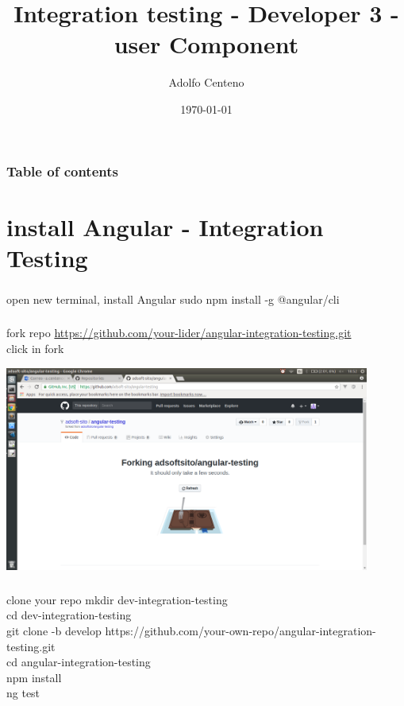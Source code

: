 \documentclass{beamer}
\begin{document}
\title{Integration testing - Developer 3 - user Component}  
\author{Adolfo Centeno}
\date{\today} 

\begin{frame}
\titlepage
\end{frame}

\begin{frame}\frametitle{Table of contents}\tableofcontents
\end{frame} 


\section{install Angular - Integration Testing} 

\begin{frame}\frametitle{} 


\begin{block}{open new terminal, install Angular}
sudo npm install -g @angular/cli
\end{block}

\end{frame}


\begin{frame}\frametitle{} 

\begin{block}{fork repo}
\url{https://github.com/your-lider/angular-integration-testing.git} \\
click in fork
\end{block}

\begin{center}
\includegraphics[width=0.9\textwidth]{forking.png}
\end{center}

\end{frame}




\begin{frame}\frametitle{} 

\begin{block}{clone your repo}
mkdir dev-integration-testing \\
cd dev-integration-testing	 \\
git clone -b develop https://github.com/your-own-repo/angular-integration-testing.git \\
cd angular-integration-testing \\
npm install \\
ng test   
\end{block}

\end{frame}
\end{document}
